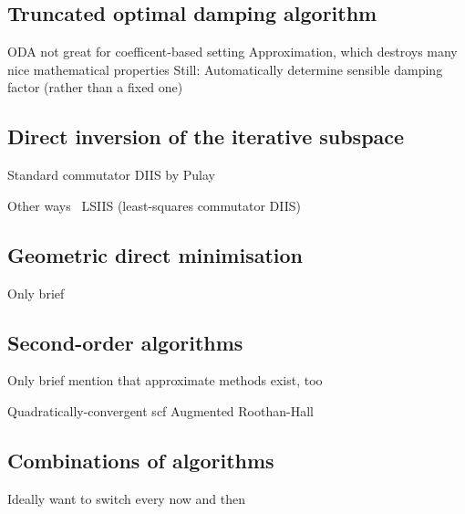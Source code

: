 \subsection{Truncated optimal damping algorithm}
\label{sec:tODA}
ODA not great for coefficent-based setting
Approximation, which destroys many nice mathematical properties
Still: Automatically determine sensible damping factor (rather than a fixed one)

\subsection{Direct inversion of the iterative subspace}
\label{sec:DIIS}

Standard commutator DIIS by Pulay~\cite{Pulay1982,Hamilton1986}

Other ways~\cite{Shepard2007}
LSIIS (least-squares commutator DIIS)~\cite{Li2016}

\subsection{Geometric direct minimisation}
Only brief

\subsection{Second-order \SCF algorithms}
\label{sec:SOSCF}
Only brief
mention that approximate methods exist, too


Quadratically-convergent scf \cite{Ochsenfeld1997}
Augmented Roothan-Hall \cite{Hoest2008}



\subsection{Combinations of algorithms}
Ideally want to switch every now and then

